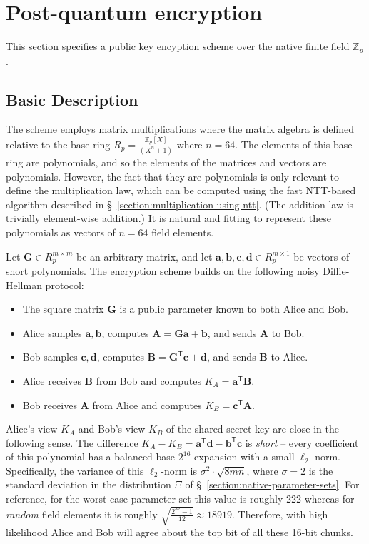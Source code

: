 
\section{Post-quantum encryption}

This section specifies a public key encyption scheme over the native finite field $\mathbb{Z}_p$. 

\subsection{Basic Description}

The scheme employs matrix multiplications where the matrix algebra is defined relative to the base ring $R_p = \frac{\mathbb{Z}_p[X]}{(X^n + 1)}$ where $n=64$. The elements of this base ring are polynomials, and so the elements of the matrices and vectors are polynomials. However, the fact that they are polynomials is only relevant to define the multiplication law, which can be computed using the fast NTT-based algorithm described in \S~\ref{section:multiplication-using-ntt}. (The addition law is trivially element-wise addition.) It is natural and fitting to represent these polynomials as vectors of $n=64$ field elements.

Let $\mathbf{G} \in R_p^{m \times m}$ be an arbitrary matrix, and let $\mathbf{a}, \mathbf{b}, \mathbf{c}, \mathbf{d} \in R_p^{m \times 1}$ be vectors of short polynomials. The encryption scheme builds on the following noisy Diffie-Hellman protocol:
\begin{itemize}
\item The square matrix $\mathbf{G}$ is a public parameter known to both Alice and Bob.
\item Alice samples $\mathbf{a}, \mathbf{b}$, computes $\mathbf{A} = \mathbf{G} \mathbf{a} + \mathbf{b}$, and sends $\mathbf{A}$ to Bob.
\item Bob samples $\mathbf{c}, \mathbf{d}$, computes $\mathbf{B} = \mathbf{G}^\mathsf{T} \mathbf{c} + \mathbf{d}$, and sends $\mathbf{B}$ to Alice.
\item Alice receives $\mathbf{B}$ from Bob and computes $K_A = \mathbf{a}^\mathsf{T} \mathbf{B}$.
\item Bob receives $\mathbf{A}$ from Alice and computes $K_B = \mathbf{c}^\mathsf{T} \mathbf{A}$.
\end{itemize}
Alice's view $K_A$ and Bob's view $K_B$ of the shared secret key are close in the following sense. The difference $K_A - K_B = \mathbf{a}^\mathsf{T} \mathbf{d} - \mathbf{b}^\mathsf{T} \mathbf{c}$ is \emph{short} -- every coefficient of this polynomial has a balanced base-$2^{16}$ expansion with a small $\ell_2$-norm. Specifically, the variance of this $\ell_2$-norm is $\sigma^2 \cdot \sqrt{8mn}$, where $\sigma=2$ is the standard deviation in the distribution $\Xi$ of \S~\ref{section:native-parameter-sets}. For reference, for the worst case parameter set this value is roughly 222 whereas for \emph{random} field elements it is roughly $\sqrt{\frac{2^{32}-1}{12}} \approx 18919$. Therefore, with high likelihood Alice and Bob will agree about the top bit of all these 16-bit chunks. 

